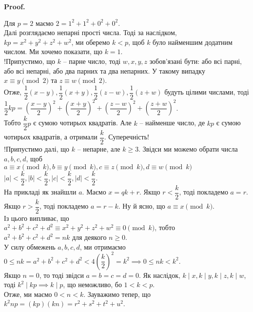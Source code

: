 \documentclass[a4paper, 14pt]{extarticle}
\makeatletter
\theoremstyle{theoremdd}
\theoremstyle{theoremdd}
\theoremstyle{theoremdd}
\theoremstyle{theoremdd}
\theoremstyle{theoremdd}
\theoremstyle{theoremdd}
\theoremstyle{theoremdd}
\theoremstyle{theoremdd}
\def\qed{$\blacksquare$}
\renewenvironment{proof}[1][Proof.\\]{\par
\pushQED{\hfill \qed}%
\normalfont \topsep6\p@\@plus6\p@\relax
\trivlist
\item\relax
{\bfseries
#1\@addpunct{.}}\hspace\labelsep\ignorespaces
}{%
\popQED\endtrivlist\@endpefalse
}
\makeatother
\begin{document}
\begin{proof}
Для $p = 2$ маємо $2 = 1^2+1^2+0^2+0^2$.\\
Далі розглядаємо непарні прості числа. Тоді за наслідком, \\
$kp = x^2+y^2+z^2+w^2$, ми оберемо $k < p$, щоб $k$ було найменшим додатним числом. Ми хочемо показати, що $k = 1$.\\
!Припустимо, що $k$ -- парне число, тоді $w,x,y,z$ зобов'язані бути: або всі парні, або всі непарні, або два парних та два непарних. У такому випадку $x \equiv y \pmod 2$ та $z \equiv w \pmod 2$.\\
Отже, $\dfrac{1}{2}(x-y),\dfrac{1}{2}(x+y),\dfrac{1}{2}(z-w),\dfrac{1}{2}(z+w)$ будуть цілими числами, тоді\\
$\dfrac{1}{2}kp = \left( \dfrac{x-y}{2} \right)^2 + \left( \dfrac{x+y}{2} \right)^2 + \left( \dfrac{z-w}{2} \right)^2 + \left( \dfrac{z+w}{2} \right)^2$.\\
Тобто $\dfrac{k}{2}p$ є сумою чотирьох квадратів. Але $k$ -- найменше число, де $kp$ є сумою чотирьох квадратів, а отримали $\dfrac{k}{2}$. Суперечність!\\
!Припустимо далі, що $k$ -- непарне, але $k \geq 3$. Звідси ми можемо обрати числа $a,b,c,d$, щоб\\
$a \equiv x \pmod k, b \equiv y \pmod k, c \equiv z \pmod k, d \equiv w \pmod k$\\
$|a| < \dfrac{k}{2}, |b| < \dfrac{k}{2}, |c| < \dfrac{k}{2}, |d| < \dfrac{k}{2}$.\\
На прикладі як знайшли $a$. Маємо $x = qk + r$. Якщо $r < \dfrac{k}{2}$, тоді покладемо $a = r$. Якщо $r > \dfrac{k}{2}$, тоді покладемо $a = r-k$. Ну й ясно, що $a \equiv x \pmod k$.\\
Із цього випливає, що\\
$a^2+b^2+c^2+d^2 \equiv x^2+y^2+z^2+w^2 \equiv 0 \pmod k$, тобто\\
$a^2+b^2+c^2+d^2 = nk$ для деякого $n \geq 0$.\\
У силу обмежень $a,b,c,d$, ми отримаємо\\
$0 \leq nk = a^2+b^2+c^2+d^2 < 4 \left( \dfrac{k}{2} \right)^2 = k^2 \implies 0 \leq nk < k^2$.\\
Якщо $n = 0$, то тоді звідси $a=b=c=d=0$. Як наслідок, $k \mid x, k \mid y, k \mid z, k \mid w$, тоді $k^2 \mid kp \implies k \mid p$, що неможливо, бо $1 < k < p$.\\
Отже, ми маємо $0 < n < k$. Зауважимо тепер, що\\
$k^2np = (kp)(kn) = r^2+s^2+t^2+u^2$.\\

\end{proof}
\end{document}
